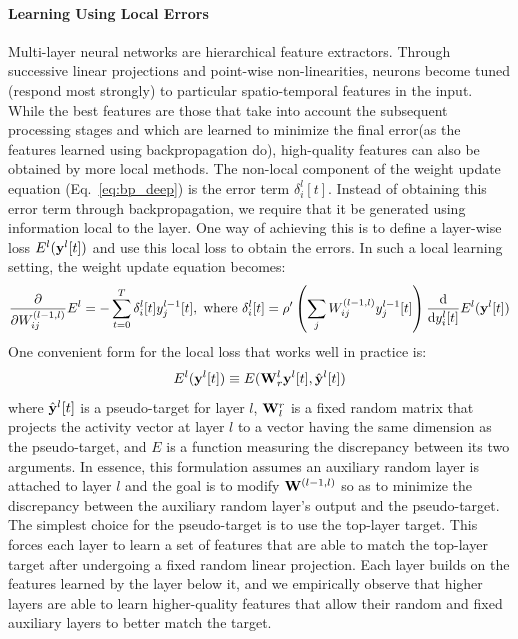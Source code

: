 \documentclass[journal,onecolumn,11pt]{IEEEtran}
\begin{document}
\paragraph{Learning Using Local Errors} Multi-layer neural networks are hierarchical feature extractors.
Through successive linear projections and point-wise non-linearities, neurons become tuned (respond most strongly) to particular spatio-temporal features in the input.
While the best features are those that take into account the subsequent processing stages and which are learned to minimize the final error(as the features learned using backpropagation do), high-quality features can also be obtained by more local methods.
The non-local component of the weight update equation (Eq.~\ref{eq:bp_deep}) is the error term $\delta_i^l[t]$.
Instead of obtaining this error term through backpropagation, we require that it be generated using information local to the layer. 
One way of achieving this is to define a layer-wise loss $E^l({\bf y}^l[t])$ and use this local loss to obtain the errors.
In such a local learning setting, the weight update equation becomes:
%
\begin{equation}\label{eq:bp_local}
  \frac{\mathrm{\partial}}{\mathrm{\partial} W^{(l-1,l)}_{ij}} E^l = -\sum_{t=0}^T \delta_{i}^{l}[t]  y^{l-1}_j[t],
    \text{ where }
    \delta_{i}^{l} [t] = \rho'\left(\sum_j W^{(l-1,l)}_{ij} y^{l-1}_j [t] \right) \frac{\mathrm{d}}{\mathrm{d}y_i^l[t]}E^l({\bf y}^l[t])
\end{equation}
One convenient form for the local loss that works well in practice is:
\begin{equation}
E^l({\bf y}^l[t]) \equiv E({\bf W}^l_{r} {\bf y}^l[t],\hat{{\bf y}}^{l}[t])
\end{equation}
%
where $\hat{{\bf y}}^{l}[t]$ is a pseudo-target for layer $l$, ${\bf W}_l^{r}$ is a fixed random matrix that projects the activity vector at layer $l$ to a vector having the same dimension as the pseudo-target, and $E$ is a function measuring the discrepancy between its two arguments.
In essence, this formulation assumes an auxiliary random layer is attached to layer $l$ and the goal is to modify ${\bf W}^{(l-1,l)}$ so as to minimize the discrepancy between the auxiliary random layer's output and the pseudo-target. 
The simplest choice for the pseudo-target is to use the top-layer target. 
This forces each layer to learn a set of features that are able to match the top-layer target after undergoing a fixed random linear projection. Each layer builds on the features learned by the layer below it, and we empirically observe that higher layers are able to learn higher-quality features that allow their random and fixed auxiliary layers to better match the target.
\label{sec:spatial_credit_assignment}
\end{document}

